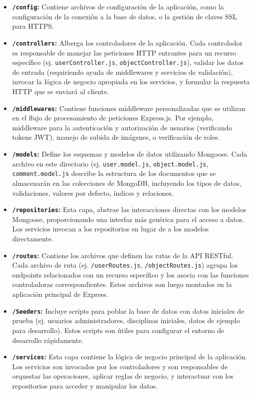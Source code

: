 \begin{itemize}
    \item \textbf{\texttt{/config}:} Contiene archivos de configuración de la aplicación, como la configuración de la conexión a la base de datos, o la gestión de claves SSL para HTTPS.
    \item \textbf{\texttt{/controllers}:} Alberga los controladores de la aplicación. Cada controlador es responsable de manejar las peticiones HTTP entrantes para un recurso específico (ej. \texttt{userController.js}, \texttt{objectController.js}), validar los datos de entrada (requiriendo ayuda de middlewares y servicios de validación), invocar la lógica de negocio apropiada en los servicios, y formular la respuesta HTTP que se enviará al cliente.
    \item \textbf{\texttt{/middlewares}:} Contiene funciones middleware personalizadas que se utilizan en el flujo de procesamiento de peticiones Express.js. Por ejemplo, middleware para la autenticación y autorización de usuarios (verificando tokens JWT), manejo de subida de imágenes, o verificación de roles.
    \item \textbf{\texttt{/models}:} Define los esquemas y modelos de datos utilizando Mongoose. Cada archivo en este directorio (ej. \texttt{user.model.js}, \texttt{object.model.js}, \texttt{comment.model.js} describe la estructura de los documentos que se almacenarán en las colecciones de MongoDB, incluyendo los tipos de datos, validaciones, valores por defecto, índices y relaciones.
    \item \textbf{\texttt{/repositories}:} Esta capa, abstrae las interacciones directas con los modelos Mongoose, proporcionando una interfaz más genérica para el acceso a datos. Los servicios invocan a los repositorios en lugar de a los modelos directamente.
    \item \textbf{\texttt{/routes}:} Contiene los archivos que definen las rutas de la API RESTful. Cada archivo de ruta (ej. \texttt{/userRoutes.js}, \texttt{/objectRoutes.js}) agrupa los endpoints relacionados con un recurso específico y los asocia con las funciones controladoras correspondientes. Estos archivos son luego montados en la aplicación principal de Express.
    \item \textbf{\texttt{/Seeders}:} Incluye scripts para poblar la base de datos con datos iniciales de prueba (ej. usuarios administradores, disciplinas iniciales, datos de ejemplo para desarrollo). Estos scripts son útiles para configurar el entorno de desarrollo rápidamente.
    \item \textbf{\texttt{/services}:} Esta capa contiene la lógica de negocio principal de la aplicación. Los servicios son invocados por los controladores y son responsables de orquestar las operaciones, aplicar reglas de negocio, y interactuar con los repositorios para acceder y manipular los datos.

\end{itemize}
